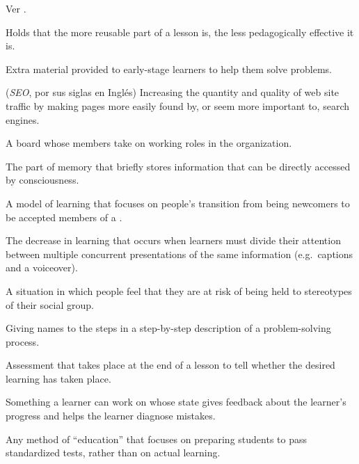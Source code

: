 \begin{description}
Ver .

 Holds that the more reusable
part of a lesson is, the less pedagogically effective it is.

 Extra material provided to early-stage
learners to help them solve problems.

 (\emph{SEO}, por sus siglas en Inglés)  Increasing the quantity and quality
of web site traffic by making pages more easily found by, or seem more important
to, search engines.

 A board whose members take on working roles
in the organization.

 The part of memory that briefly
stores information that can be directly accessed by consciousness.

 A model of learning that focuses
on people's transition from being newcomers to be accepted members of a
.

 The decrease in
learning that occurs when learners must divide their attention between multiple
concurrent presentations of the same information (e.g.\ captions and a
voiceover).

 A situation in which people feel
that they are at risk of being held to stereotypes of their social group.

 Giving names to the steps in a
step-by-step description of a problem-solving process.

 Assessment that takes
place at the end of a lesson to tell whether the desired learning has taken
place.

 Something a learner can work on
whose state gives feedback about the learner's progress and helps the learner
diagnose mistakes.

 Any method of ``education''
that focuses on preparing students to pass standardized tests, rather than on
actual learning.


\end{description}
